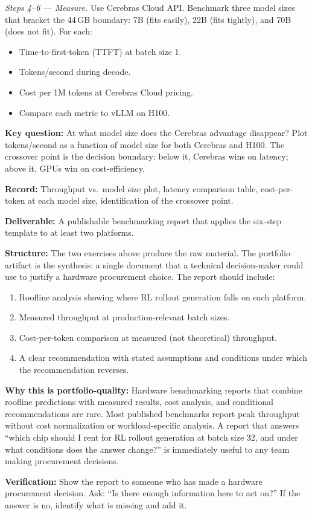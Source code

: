 \begin{exercise}
\textit{Steps 4--6 --- Measure.} Use Cerebras Cloud API. Benchmark three model sizes that bracket the 44\,GB boundary: 7B (fits easily), 22B (fits tightly), and 70B (does not fit). For each:
\begin{itemize}
  \item Time-to-first-token (TTFT) at batch size 1.
  \item Tokens/second during decode.
  \item Cost per 1M tokens at Cerebras Cloud pricing.
  \item Compare each metric to vLLM on H100.
\end{itemize}

\textbf{Key question:} At what model size does the Cerebras advantage disappear? Plot tokens/second as a function of model size for both Cerebras and H100. The crossover point is the decision boundary: below it, Cerebras wins on latency; above it, GPUs win on cost-efficiency.

\textbf{Record:} Throughput vs.\ model size plot, latency comparison table, cost-per-token at each model size, identification of the crossover point.
\end{exercise}

\begin{portfolio}
\textbf{Deliverable:} A publishable benchmarking report that applies the six-step template to at least two platforms.

\textbf{Structure:} The two exercises above produce the raw material. The portfolio artifact is the synthesis: a single document that a technical decision-maker could use to justify a hardware procurement choice. The report should include:
\begin{enumerate}
  \item Roofline analysis showing where RL rollout generation falls on each platform.
  \item Measured throughput at production-relevant batch sizes.
  \item Cost-per-token comparison at measured (not theoretical) throughput.
  \item A clear recommendation with stated assumptions and conditions under which the recommendation reverses.
\end{enumerate}

\textbf{Why this is portfolio-quality:} Hardware benchmarking reports that combine roofline predictions with measured results, cost analysis, and conditional recommendations are rare. Most published benchmarks report peak throughput without cost normalization or workload-specific analysis. A report that answers ``which chip should I rent for RL rollout generation at batch size 32, and under what conditions does the answer change?'' is immediately useful to any team making procurement decisions.

\textbf{Verification:} Show the report to someone who has made a hardware procurement decision. Ask: ``Is there enough information here to act on?'' If the answer is no, identify what is missing and add it.
\end{portfolio}

\newpage
